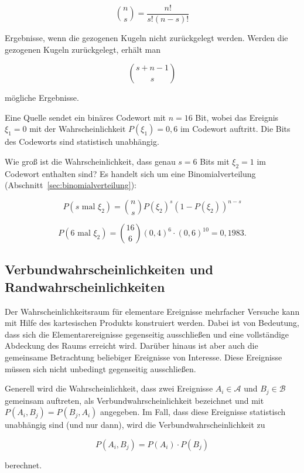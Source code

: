 $$
\binom{n}{s} = \frac{n!}{s!(n-s)!}
$$

Ergebnisse, wenn die gezogenen Kugeln nicht zurückgelegt werden. Werden die gezogenen Kugeln zurückgelegt, erhält man

$$
\binom{s + n - 1}{s}
$$

mögliche Ergebnisse.

\begin{beispiel}[Stichprobe]
Eine Quelle sendet ein binäres Codewort mit $n = 16$ Bit, wobei das Ereignis $\xi_1 = 0$ mit der Wahrscheinlichkeit $P(\xi_1) = 0{,}6$ im Codewort auftritt. Die Bits des Codeworts sind statistisch unabhängig.

Wie groß ist die Wahrscheinlichkeit, dass genau $s = 6$ Bits mit $\xi_2 = 1$ im Codewort enthalten sind? Es handelt sich um eine Binomialverteilung (Abschnitt~\ref{sec:binomialverteilung}):

$$
P(s \text{ mal } \xi_2) = \binom{n}{s} P(\xi_2)^s (1 - P(\xi_2))^{n-s}
$$

$$
P(6 \text{ mal } \xi_2) = \binom{16}{6} (0{,}4)^6 \cdot (0{,}6)^{10} = 0{,}1983.
$$
\end{beispiel}

\subsection{Verbundwahrscheinlichkeiten und Randwahrscheinlichkeiten}
\label{sec:verbundwahrscheinlichkeiten}

Der Wahrscheinlichkeitsraum für elementare Ereignisse mehrfacher Versuche kann mit Hilfe des kartesischen Produkts konstruiert werden. Dabei ist von Bedeutung, dass sich die Elementarereignisse gegenseitig ausschließen und eine vollständige Abdeckung des Raums erreicht wird. Darüber hinaus ist aber auch die gemeinsame Betrachtung beliebiger Ereignisse von Interesse. Diese Ereignisse müssen sich nicht unbedingt gegenseitig ausschließen.

\begin{definition}[Verbundwahrscheinlichkeit]
Generell wird die Wahrscheinlichkeit, dass zwei Ereignisse $A_i \in \mathcal{A}$ und $B_j \in \mathcal{B}$ gemeinsam auftreten, als Verbundwahrscheinlichkeit bezeichnet und mit $P(A_i, B_j) = P(B_j, A_i)$ angegeben. Im Fall, dass diese Ereignisse statistisch unabhängig sind (und nur dann), wird die Verbundwahrscheinlichkeit zu

$$
P(A_i, B_j) = P(A_i) \cdot P(B_j)
$$

berechnet.
\end{definition}

